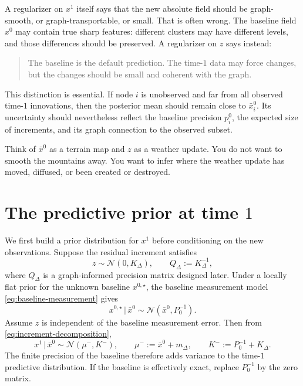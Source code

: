 \documentclass[11pt]{article}
\numberwithin{equation}{section}
\newcommand{\given}{\,|\,}
\begin{document}
A regularizer on $x^1$ itself says that the new absolute field should be graph-smooth, or graph-transportable, or small.  That is often wrong.  The baseline field $x^0$ may contain true sharp features: different clusters may have different levels, and those differences should be preserved.  A regularizer on $z$ says instead:

\begin{quote}
The baseline is the default prediction.  The time-$1$ data may force changes, but the changes should be small and coherent with the graph.
\end{quote}

This distinction is essential.  If node $i$ is unobserved and far from all observed time-$1$ innovations, then the posterior mean should remain close to $\bar x_i^0$.  Its uncertainty should nevertheless reflect the baseline precision $p_i^0$, the expected size of increments, and its graph connection to the observed subset.

\begin{heuristicbox}
Think of $\bar x^0$ as a terrain map and $z$ as a weather update.  You do not want to smooth the mountains away.  You want to infer where the weather update has moved, diffused, or been created or destroyed.
\end{heuristicbox}

\section{The predictive prior at time $1$}
\label{sec:predictive-prior}

We first build a prior distribution for $x^1$ before conditioning on the new observations.  Suppose the residual increment satisfies
\begin{equation}
  z\sim\mathcal N(0,K_\Delta),
  \qquad
  Q_\Delta:=K_\Delta^{-1},
  \label{eq:increment-Gaussian}
\end{equation}
where $Q_\Delta$ is a graph-informed precision matrix designed later.  Under a locally flat prior for the unknown baseline $x^{0,\star}$, the baseline measurement model \eqref{eq:baseline-measurement} gives
\begin{equation}
  x^{0,\star}\given \bar x^0\sim\mathcal N(\bar x^0,P_0^{-1}).
  \label{eq:baseline-posterior-flat}
\end{equation}
Assume $z$ is independent of the baseline measurement error.  Then from \eqref{eq:increment-decomposition},
\begin{equation}
  x^1\given\bar x^0
  \sim \mathcal N(\mu^-,K^-),
  \qquad
  \mu^-:=\bar x^0+m_\Delta,
  \qquad
  K^-:=P_0^{-1}+K_\Delta.
  \label{eq:predictive-prior}
\end{equation}
The finite precision of the baseline therefore adds variance to the time-$1$ predictive distribution.  If the baseline is effectively exact, replace $P_0^{-1}$ by the zero matrix.
\end{document}
